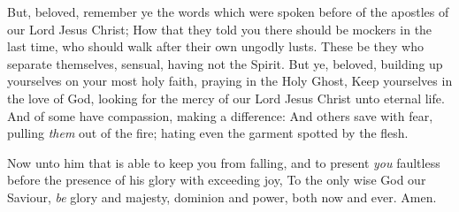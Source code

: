 \documentclass[11pt,letterpaper,oneside]{memoir}
\begin{document}
But, beloved, remember ye the words which were spoken before of the
apostles of our Lord Jesus Christ;  How that they told you there
should be mockers in the last time, who should walk after their own
ungodly lusts.  These be they who separate themselves, sensual, having
not the Spirit.  But ye, beloved, building up yourselves on your most
holy faith, praying in the Holy Ghost,  Keep yourselves in the love of
God, looking for the mercy of our Lord Jesus Christ unto eternal life.
And of some have compassion, making a difference:  And others save
with fear, pulling \emph{them} out of the fire; hating even the
garment spotted by the flesh.

Now unto him that is able to keep you from falling, and to present
\emph{you} faultless before the presence of his glory with exceeding
joy,  To the only wise God our Saviour, \emph{be} glory and majesty,
dominion and power, both now and ever. Amen.
\end{document}
